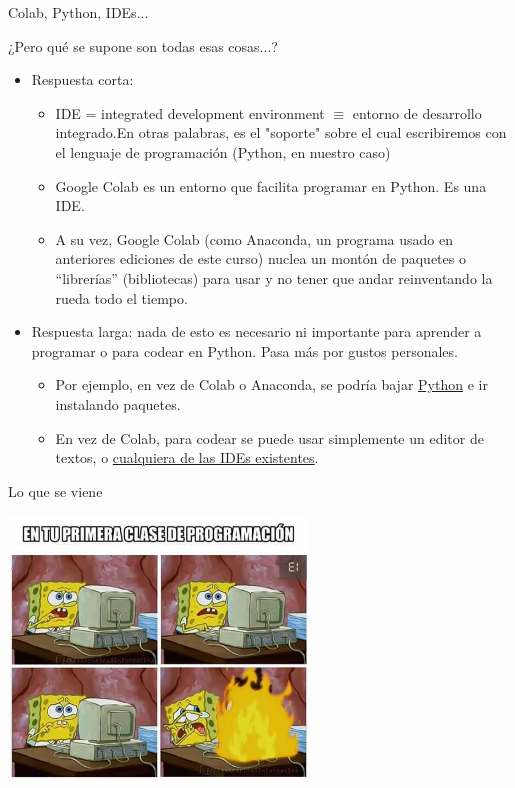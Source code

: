 \documentclass{beamer}
\begin{document}
\begin{frame}{Colab, Python, IDEs...}
\begin{block}{¿Pero qué se supone son todas esas cosas...?}\pause
\begin{itemize}
	\item Respuesta corta:\pause
		\begin{itemize}
			\item IDE = integrated development environment $\equiv$ entorno de desarrollo integrado.\pause En otras palabras, es el "soporte" sobre el cual escribiremos con el lenguaje de programación (Python, en nuestro caso) \pause
			\item Google Colab es un entorno que facilita programar en Python. Es una IDE.\pause			
			\item A su vez, Google Colab (como Anaconda, un programa usado en anteriores ediciones de este curso) nuclea un montón de paquetes o ``librerías'' (bibliotecas) para usar y no tener que andar reinventando la rueda todo el tiempo.\pause
			


		\end{itemize}
	\item Respuesta larga: nada de esto es necesario ni importante para aprender a programar o para codear en Python. Pasa más por gustos personales.\pause
	\begin{itemize}
		\item Por ejemplo, en vez de Colab o Anaconda, se podría bajar \textcolor{blue}{\href{https://www.python.org/}{Python}} e ir instalando paquetes.\pause		
		\item En vez de Colab, para codear se puede usar simplemente un editor de textos, o \textcolor{blue}{\href{https://wiki.python.org/moin/IntegratedDevelopmentEnvironments}{cualquiera de las IDEs existentes}}.
	\end{itemize}
\end{itemize}
\end{block}
\end{frame}

\begin{frame}{Lo que se viene}
\pause
\begin{center}
\includegraphics[height=7cm, scale=0.5]{meme_explosion.png}
\end{center}
\end{frame}
\end{document}
